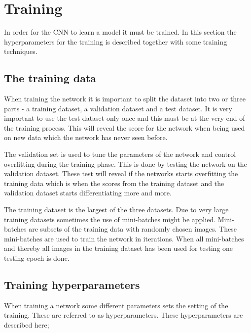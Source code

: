 \graphicspath{{Chapters/Project/}}

\section{Training} %
\label{sec:training}

In order for the CNN to learn a model it must be trained. In this section the
hyperparameters for the training is described together with some training
techniques.

\subsection{The training data} %
\label{sub:the_training_data}

When training the network it is important to split the dataset into two or three parts - a training dataset, a validation dataset and a test dataset. It is very important to use the test dataset only once and this must be at the very end of the training process. This will reveal the score for the network when being used on new data which the network has never seen before.

The validation set is used to tune the parameters of the network and control overfitting during the training phase. This is done by testing the network on the validation dataset. These test will reveal if the networks starts overfitting the training data which is when the scores from the training dataset and the validation dataset starts differentiating more and more.

The training dataset is the largest of the three datasets. Due to very large
training datasets sometimes the use of mini-batches might be applied.
Mini-batches are subsets of the training data with randomly chosen images. These mini-batches are used to train the network in iterations. When all mini-batches and thereby all images in the training dataset has been used for testing one testing epoch is done.


\subsection{Training hyperparameters} %
\label{sub:training_hyperparameters}

When training a network some different parameters sets the setting of the training. These are referred to as hyperparameters. These hyperparameters are described here;

